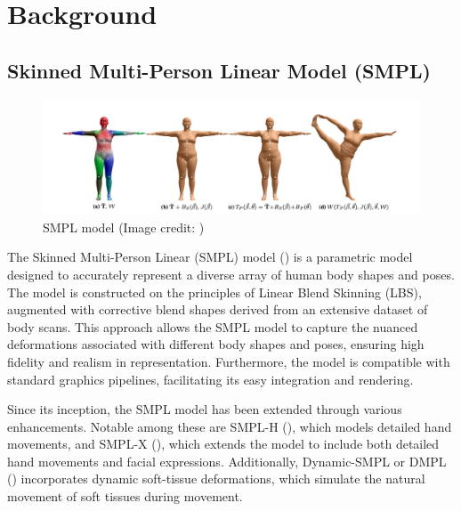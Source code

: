 \chapter{Background} \label{sec:methods}

\section{Skinned Multi-Person Linear Model (SMPL)}
\begin{figure}[h]
    \centering
    \includegraphics[width=\linewidth]{figures/smpl.png}
    \caption{SMPL model (Image credit: \cite{SMPL:2015})}
\end{figure}
The Skinned Multi-Person Linear (SMPL) model (\cite{SMPL:2015}) is a parametric model designed to accurately represent a diverse array of human body shapes and poses. The model is constructed on the principles of Linear Blend Skinning (LBS), augmented with corrective blend shapes derived from an extensive dataset of body scans. This approach allows the SMPL model to capture the nuanced deformations associated with different body shapes and poses, ensuring high fidelity and realism in representation. Furthermore, the model is compatible with standard graphics pipelines, facilitating its easy integration and rendering.

Since its inception, the SMPL model has been extended through various enhancements. Notable among these are SMPL-H (\cite{MANO:SIGGRAPHASIA:2017}), which models detailed hand movements, and SMPL-X (\cite{SMPL-X:2019}), which extends the model to include both detailed hand movements and facial expressions. Additionally, Dynamic-SMPL or DMPL (\cite{SMPL:2015}) incorporates dynamic soft-tissue deformations, which simulate the natural movement of soft tissues during movement.

